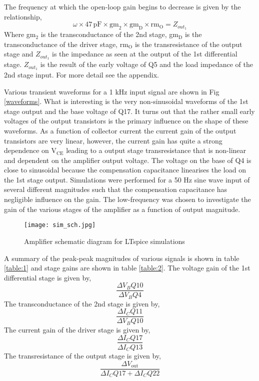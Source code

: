 \documentclass[a4paper,10pt, oneside]{article}
\begin{document}
The frequency at which the open-loop gain begins to decrease is given by the relationship,
\begin{equation}
\omega\times 47\,\textrm{pF}\times\textrm{gm}_{2}\times\textrm{gm}_{\textrm{D}}\times\textrm{rm}_{\textrm{O}}= Z_{out_{1} }
\end{equation}
Where gm$_{2}$ is the transconductance of the 2nd stage, gm$_{\textrm{D}}$ is the transconductance of the driver stage, rm$_{\textrm{O}}$ is the transresistance of the output stage and $Z_{out_{1}}$ is the  impedance as seen at the output of the 1st differential stage. $Z_{out_{1}}$ is the result of the early voltage of Q5 and the load impedance of the 2nd stage input. For more detail see the appendix. 

Various transient waveforms for a 1 kHz input signal are shown in Fig \ref{waveforms}. What is interesting is the very non-sinusoidal waveforms of the 1st stage output and the base voltage of Q17. It turns out that the rather small early voltages of the output transistors is the primary influence on the shape of these waveforms. As a function of collector current the current gain of the output transistors are very linear, however, the current gain has quite a strong dependence on V$_{\textrm{CE}}$ leading to a output stage transresistance that is non-linear and dependent on the amplifier output voltage. The voltage on the base of Q4 is close to sinusoidal because the compensation capacitance linearises the load on the 1st stage output. Simulations were performed for a 50 Hz sine wave input of several different magnitudes such that the compensation capacitance has negligible influence on the gain. The low-frequency was chosen to investigate the gain of the various stages of the amplifier as a function of output magnitude. 
\begin{figure}[H]
\begin{centering}
	\texttt{[image: sim\_sch.jpg]}
	\caption{Amplifier schematic diagram for LTspice simulations}\label{sim_sch}
\end{centering}	
\end{figure}
A summary of the peak-peak magnitudes of various signals is shown in table \ref{table:1} and stage gains are shown in table \ref{table:2}. The voltage gain of the 1st differential stage is given by,
\begin{equation}
\frac{\Delta V_{B}Q10}{\Delta V_{B}Q4}
\end{equation}
The transconductance of the 2nd stage is given by,
\begin{equation}
\frac{\Delta I_{C}Q11}{\Delta V_{B}Q10}
\end{equation}
The current gain of the driver stage is given by,
\begin{equation}
\frac{\Delta I_{C}Q17}{\Delta I_{C}Q13}
\end{equation}
The transresistance of the output stage is given by,
\begin{equation}
\frac{\Delta V_{\textrm{out}}}{\Delta I_{C}Q17 + \Delta I_{C}Q22} 
\end{equation}
\end{document}
